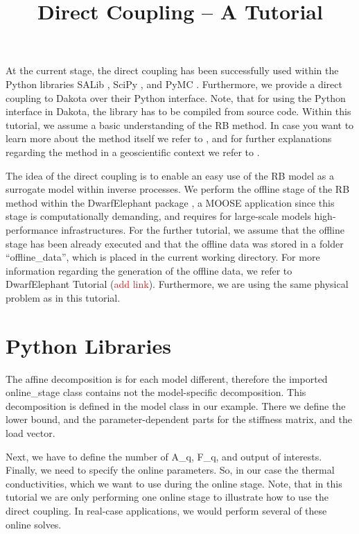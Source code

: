 \documentclass[11pt, a4paper, DIV=14]{scrartcl}
\begin{document}
\title{Direct Coupling -- A Tutorial}

\maketitle

At the current stage, the direct coupling has been successfully used within the Python libraries SALib \cite{salib}, SciPy \cite{scipy}, and PyMC \cite{pymc}. Furthermore, we provide a direct coupling to Dakota \cite{adams_et_al} over their Python interface. Note, that for using the Python interface in Dakota, the library has to be compiled from source code. Within this tutorial, we assume a basic understanding of the RB method. In case you want to learn more about the method itself we refer to \cite{prud_et_al,veroy_et_al, hest_et_al}, and for further explanations regarding the method in a geoscientific context we refer to \cite{degen_et_al}.

The idea of the direct coupling is to enable an easy use of the RB model as a surrogate model within inverse processes. We perform the offline stage of the RB method within the DwarfElephant package \cite{degen_et_al}, a MOOSE application \cite{moose-web-page, tonks_et_al} since this stage is computationally demanding, and requires for large-scale models high-performance infrastructures. For the further tutorial, we assume that the offline stage has been already executed and that the offline data was stored in a folder ``offline\_data'', which is placed in the current working directory. For more information regarding the generation of the offline data, we refer to DwarfElephant Tutorial (\textcolor{red}{add link}). Furthermore, we are using the same physical problem as in this tutorial.

\section{Python Libraries}
The affine decomposition is for each model different, therefore the imported online\_stage class contains not the model-specific decomposition. This decomposition is defined in the model class in our example. There we define the lower bound, and the parameter-dependent parts for the stiffness matrix, and the load vector. 

Next, we have to define the number of A\_q, F\_q, and output of interests. Finally, we need to specify the online parameters. So, in our case the thermal conductivities, which we want to use during the online stage. Note, that in this tutorial we are only performing one online stage to illustrate how to use the direct coupling. In real-case applications, we would perform several of these online solves. 
 
\end{document}
